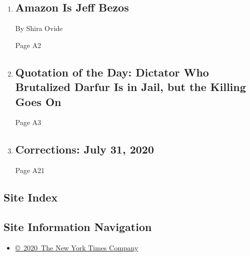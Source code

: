 \begin{enumerate}
\def\labelenumi{\arabic{enumi}.}
\item
  \href{/2020/07/28/technology/amazon-jeff-bezos.html}{}

  \hypertarget{amazon-is-jeff-bezos}{%
  \subsection{Amazon Is Jeff Bezos}\label{amazon-is-jeff-bezos}}

  By Shira Ovide

  Page A2
\item
  \href{/2020/07/30/todayspaper/quotation-of-the-day-dictator-who-brutalized-darfur-is-in-jail-but-the-killing-goes-on.html}{}

  \hypertarget{quotation-of-the-day-dictator-who-brutalized-darfur-is-in-jail-but-the-killing-goes-on}{%
  \subsection{Quotation of the Day: Dictator Who Brutalized Darfur Is in
  Jail, but the Killing Goes
  On}\label{quotation-of-the-day-dictator-who-brutalized-darfur-is-in-jail-but-the-killing-goes-on}}

  Page A3
\item
  \href{/2020/07/30/pageoneplus/corrections-july-31-2020.html}{}

  \hypertarget{corrections-july-31-2020}{%
  \subsection{Corrections: July 31,
  2020}\label{corrections-july-31-2020}}

  Page A21
\end{enumerate}

\hypertarget{site-index}{%
\subsection{Site Index}\label{site-index}}

\hypertarget{site-information-navigation}{%
\subsection{Site Information
Navigation}\label{site-information-navigation}}

\begin{itemize}
\tightlist
\item
  \href{https://help.nytimes.com/hc/en-us/articles/115014792127-Copyright-notice}{©~2020~The
  New York Times Company}
\end{itemize}

